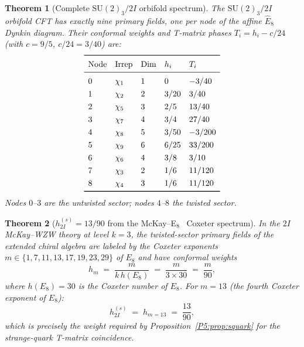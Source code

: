 \documentclass[11pt,a4paper]{article}
\newtheorem{theorem}{Theorem}[section]
\theoremstyle{definition}
\theoremstyle{remark}
\begin{document}
\begin{theorem}[Complete $\mathrm{SU}(2)_3/2I$ orbifold spectrum]
\label{P5:thm:full_spectrum}
The $\mathrm{SU}(2)_3/2I$ orbifold CFT has exactly nine primary fields,
one per node of the affine $\hat{E}_8$ Dynkin diagram.  Their conformal
weights and T-matrix phases $T_i = h_i - c/24$ (with $c = 9/5$,
$c/24 = 3/40$) are:
\begin{equation}
\renewcommand{\arraystretch}{1.3}
\begin{array}{lllll}
\toprule
\text{Node} & \text{Irrep} & \text{Dim} & h_i & T_i \\
\midrule
0 & \chi_1 & 1 & 0 & -3/40 \\
1 & \chi_2 & 2 & 3/20 & 3/40 \\
2 & \chi_5 & 3 & 2/5 & 13/40 \\
3 & \chi_7 & 4 & 3/4 & 27/40 \\
4 & \chi_8 & 5 & 3/50 & -3/200 \\
5 & \chi_9 & 6 & 6/25 & 33/200 \\
6 & \chi_6 & 4 & 3/8 & 3/10 \\
7 & \chi_3 & 2 & 1/6 & 11/120 \\
8 & \chi_4 & 3 & 1/6 & 11/120 \\
\bottomrule
\end{array}
\label{P5:eq:full_spectrum}
\end{equation}
Nodes $0$--$3$ are the untwisted sector; nodes $4$--$8$ the twisted sector.
\end{theorem}

\begin{theorem}[$h_{2I}^{(s)}=13/90$ from the McKay--E$_8$~\cite{McKay1980} Coxeter spectrum]
\label{P5:thm:h2I_coxeter}
In the $2I$ McKay--WZW theory at level $k=3$, the twisted-sector primary fields
of the extended chiral algebra are labeled by the Coxeter exponents
$m \in \{1,7,11,13,17,19,23,29\}$ of $E_8$ and have conformal weights
\begin{equation}
  h_m \;=\; \frac{m}{k\,h(E_8)} \;=\; \frac{m}{3 \times 30} \;=\; \frac{m}{90},
  \label{P5:eq:h_coxeter}
\end{equation}
where $h(E_8)=30$ is the Coxeter number of $E_8$.
For $m=13$ (the fourth Coxeter exponent of $E_8$):
\begin{equation}
  h_{2I}^{(s)} \;=\; h_{m=13} \;=\; \frac{13}{90},
  \label{P5:eq:h2I_proved}
\end{equation}
which is precisely the weight required by Proposition~\ref{P5:prop:squark}
for the strange-quark T-matrix coincidence.
\end{theorem}
\end{document}

